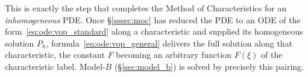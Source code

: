 This is exactly the step that completes the Method of Characteristics for an \emph{inhomogeneous} PDE. Once \S\ref{sssec:moc} has reduced the PDE to an ODE of the form~\eqref{eq:ode:vop_standard} along a characteristic and supplied its homogeneous solution $P_h$, formula~\eqref{eq:ode:vop_general} delivers the full solution along that characteristic, the constant $F$ becoming an arbitrary function $F(\xi)$ of the characteristic label. Model-$B$ (\S\ref{sec:model_b}) is solved by precisely this pairing.

